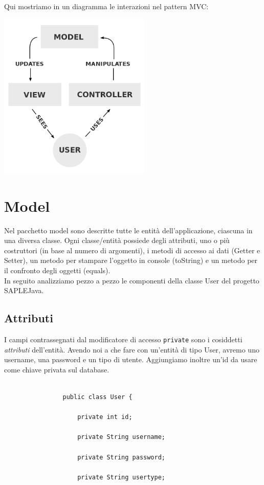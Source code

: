 \documentclass[a4paper,12 pt]{article}
\begin{document}
			\noindent Qui mostriamo in un diagramma le interazioni nel pattern MVC:\\
			
			
				\begin{center}
				\includegraphics[height=8cm]{mvc.png}
			\end{center}
			
		
	\section{Model}
		Nel pacchetto model sono descritte tutte le entità dell'applicazione, ciascuna in una diversa classe. Ogni classe/entità possiede degli attributi, uno o più costruttori (in base al numero di argomenti), i metodi di accesso ai dati (Getter e Setter), un metodo per stampare l'oggetto in console (toString) e un metodo per il confronto degli oggetti (equals).\\
		In seguito analizziamo pezzo a pezzo le componenti della classe User del progetto SAPLEJava.
		\subsection{Attributi}
			I campi contrassegnati dal modificatore di accesso \texttt{private} sono i cosiddetti \textit{attributi} dell'entità. Avendo noi a che fare con un'entità di tipo User, avremo uno username, una password e un tipo di utente. Aggiungiamo inoltre un'id da usare come chiave privata sul database.\\
			
			\begin{lstlisting}
			
				public class User {
				
					private int id;
					
					private String username;
					
					private String password;
					
					private String usertype;
				
			\end{lstlisting}
\end{document}
